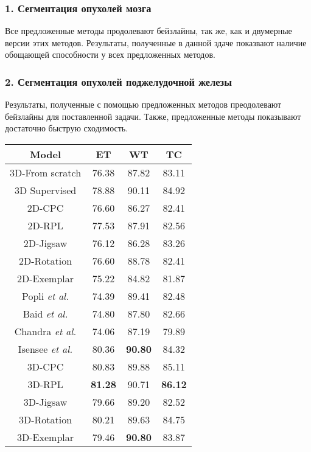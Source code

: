  \subsubsection*{1. Сегментация опухолей мозга} 
Все предложенные методы продолевают бейзлайны, так же, как и двумерные версии этих методов.
Результаты, полученные в данной здаче показвают наличие обощающей способности
у всех предложенных методов. \\

\subsubsection*{2. Сегментация опухолей поджелудочной железы} 
Результаты, полученные с помощью предложенных методов преодолевают бейзлайны для поставленной 
задачи. Также, предложенные методы показывают достаточно быструю сходимость.



\begin{center}
    \begin{tabular}[b]{ |c c c c |} \toprule
        Model & ET & WT & TC  \\
        \hline
        3D-From scratch                      & 76.38 & 87.82 & 83.11 \\
        3D Supervised                        & 78.88 & 90.11 & 84.92 \\
        \hline
        2D-CPC                               & 76.60 & 86.27 & 82.41 \\
        2D-RPL                               & 77.53 & 87.91 & 82.56 \\ 
        2D-Jigsaw                            & 76.12 & 86.28 & 83.26 \\ 
        2D-Rotation                          & 76.60 & 88.78 & 82.41 \\
        2D-Exemplar                          & 75.22 & 84.82 & 81.87 \\ 
        \hline 
        Popli \emph{et al.}   & 74.39 & 89.41 & 82.48 \\
        Baid \emph{et al.}     & 74.80 & 87.80 & 82.66 \\
        Chandra \emph{et al.}& 74.06 & 87.19 & 79.89 \\
        Isensee \emph{et al.}& 80.36 & \textbf{90.80} & 84.32 \\ 
        \hline 
        3D-CPC                               & 80.83 & 89.88 & 85.11 \\
        3D-RPL                               & \textbf{81.28} & 90.71 & \textbf{86.12} \\
        3D-Jigsaw                            & 79.66 & 89.20 & 82.52 \\
        3D-Rotation                          & 80.21 & 89.63 & 84.75 \\
        3D-Exemplar                          & 79.46 & \textbf{90.80} & 83.87 \\
        \hline
    \end{tabular}
    
        
\end{center}
    



